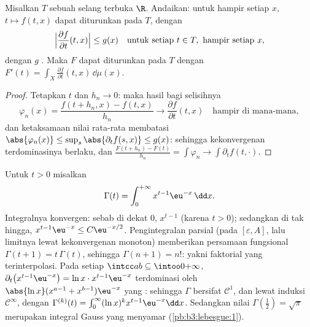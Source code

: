 \begin{theorem}
\label{thm:b3:lebesgue:paramdiff}
Misalkan $T$ sebuah selang terbuka $\R$. Andaikan: untuk hampir setiap $x$,
$t \mapsto f(t,x)$ dapat diturunkan pada $T$, dengan
\[
\Bigl|\frac{\partial f}{\partial t}(t, x)\Bigr| \leq g(x)
\quad \text{untuk setiap } t \in T,\ \text{hampir setiap } x,
\]
dengan $g$ . Maka $F$ dapat diturunkan pada $T$ dengan $F'(t)
= \int_X \frac{\partial f}{\partial t}(t, x)\,\dd\mu(x)$.
\end{theorem}

\begin{proof}
Tetapkan $t$ dan $h_n \to 0$: maka hasil bagi selisihnya
\[
\varphi_n(x) = \frac{f(t + h_n, x) - f(t, x)}{h_n}
\longrightarrow \frac{\partial f}{\partial t}(t,x)
\quad\text{hampir di mana-mana},
\]
dan ketaksamaan nilai rata-rata membatasi $\abs{\varphi_n(x)} \leq
\sup_{s}\abs{\partial_tf(s,x)} \leq g(x)$: sehingga kekonvergenan terdominasinya berlaku, dan
$\frac{F(t + h_n) - F(t)}{h_n} = \int\varphi_n \to
\int\partial_t f(t, \cdot)$.
\end{proof}

\begin{example}\label{ex:b3:lebesgue:gamma}
Untuk $t > 0$ misalkan
\[
\Gamma(t) = \int_0^{+\infty} x^{t-1}\eu^{-x}\,\dd x .
\]
Integralnya konvergen: sebab di dekat $0$, $x^{t-1}$  (karena $t >
0$); sedangkan di tak hingga, $x^{t-1}\eu^{-x} \leq C\eu^{-x/2}$.
Pengintegralan parsial (pada $[\varepsilon, A]$, lalu limitnya lewat
kekonvergenan monoton) memberikan persamaan fungsional $\Gamma(t + 1) =
t\,\Gamma(t)$, sehingga $\Gamma(n+1) = n!$: yakni faktorial yang
terinterpolasi. Pada setiap $\intcc ab \subseteq \intoo0{+\infty}$,
$\partial_t\bigl(x^{t-1}\eu^{-x}\bigr) = \ln
x\cdot x^{t-1}\eu^{-x}$ terdominasi oleh $\abs{\ln x}(x^{a-1} +
x^{b-1})\eu^{-x}$ yang : sehingga $\Gamma$ bersifat $\mathcal C^1$, dan
lewat induksi $\mathcal C^\infty$, dengan $\Gamma^{(k)}(t) =
\int_0^\infty(\ln x)^kx^{t-1}\eu^{-x}\dd x$. Sedangkan nilai
$\Gamma(\frac12) = \sqrt\pi$ merupakan integral Gauss yang
menyamar (\cref{pb:b3:lebesgue:1}).
\end{example}

